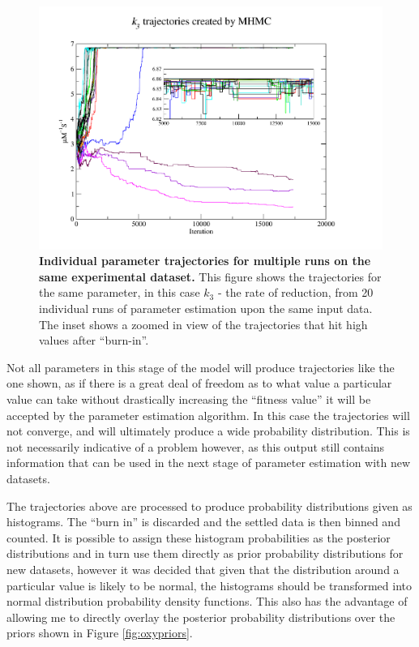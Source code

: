 \begin{figure}[tbp]
 \centering
 \includegraphics[width=14cm, trim=75px 50px 125px 25px]{./05-oxygenreduction/data/k3s.pdf}
 \caption[Individual parameter trajectories for multiple runs on the same experimental dataset]{{\bf Individual parameter trajectories for multiple runs on the same experimental dataset.} This figure shows the trajectories for the same parameter, in this case $k_3$ - the rate of \cbbthree{} reduction, from 20 individual runs of parameter estimation upon the same input data. The inset shows a zoomed in view of the trajectories that hit high values after ``burn-in''.
 \label{fig:k3s}}
\end{figure}

Not all parameters in this stage of the model will produce trajectories like the one shown, as if there is a great deal of freedom as to what value a particular value can take without drastically increasing the ``fitness value'' it will be accepted by the parameter estimation algorithm. In this case the trajectories will not converge, and will ultimately produce a wide probability distribution. This is not necessarily indicative of a problem however, as this output still contains information that can be used in the next stage of parameter estimation with new datasets.

The trajectories above are processed to produce probability distributions given as histograms. The ``burn in'' is discarded and the settled data is then binned and counted. It is possible to assign these histogram probabilities as the posterior distributions and in turn use them directly as prior probability distributions for new datasets, however it was decided that given that the distribution around a particular value is likely to be normal, the histograms should be transformed into normal distribution probability density functions. This also has the advantage of allowing me to directly overlay the posterior probability distributions over the priors shown in Figure \ref{fig:oxypriors}.

